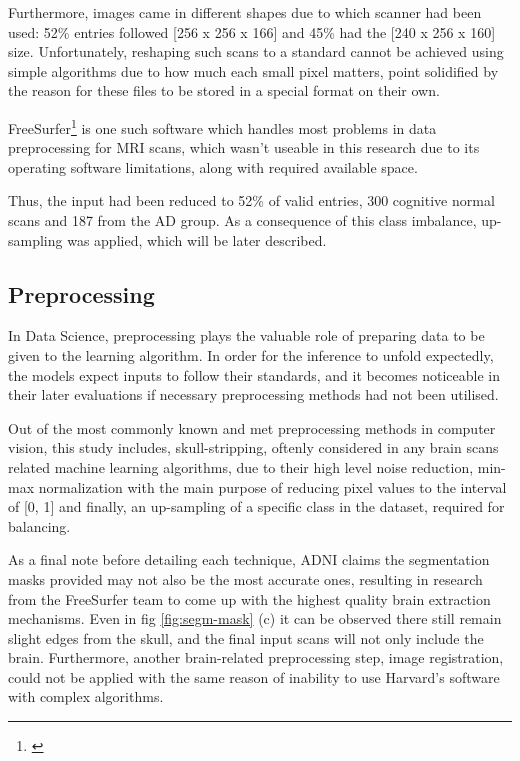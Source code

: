 \documentclass[a4paper, 12pt]{article}
\begin{document}
Furthermore, images came in different shapes
due to which scanner had been used: 52\% entries followed [256 x 256 x 166] and 45\% had the [240 x 256 x 160] size.
Unfortunately, reshaping such scans to a standard cannot be achieved using simple algorithms due to how much each small
pixel matters, point solidified by the reason for these files to be stored in a special format on their own.

FreeSurfer\footnote{\cite{FreeSurfer}} is one such software which handles most problems in data preprocessing for MRI scans, which wasn't
useable in this research due to its operating software limitations, along with required available space.

Thus, the input had been reduced to 52\% of valid entries, 300 cognitive normal scans and 187 from the AD group. As a consequence
of this class imbalance, up-sampling was applied, which will be later described.

\newpage
\subsection{Preprocessing}
In Data Science, preprocessing plays the valuable role of preparing data to be given to the learning algorithm. In order for
the inference to unfold expectedly, the models expect inputs to follow their standards, and it becomes noticeable in their later
evaluations if necessary preprocessing methods had not been utilised.

Out of the most commonly known and met preprocessing methods in computer vision, this study includes, skull-stripping, oftenly
considered in any brain scans related machine learning algorithms, due to their high level noise reduction, min-max normalization
with the main purpose of reducing pixel values to the interval of [0, 1] and finally, an up-sampling of a specific class in the
dataset, required for balancing.

As a final note before detailing each technique, ADNI claims the segmentation masks provided may not also be the most accurate ones,
resulting in research from the FreeSurfer team to come up with the highest quality brain extraction mechanisms. Even in fig \ref{fig:segm-mask}
(c) it can be observed there still remain slight edges from the skull, and the final input scans will not only include the brain.
Furthermore, another brain-related preprocessing step, image registration, could not be applied with the same reason of
inability to use Harvard's software with complex algorithms.
\end{document}
